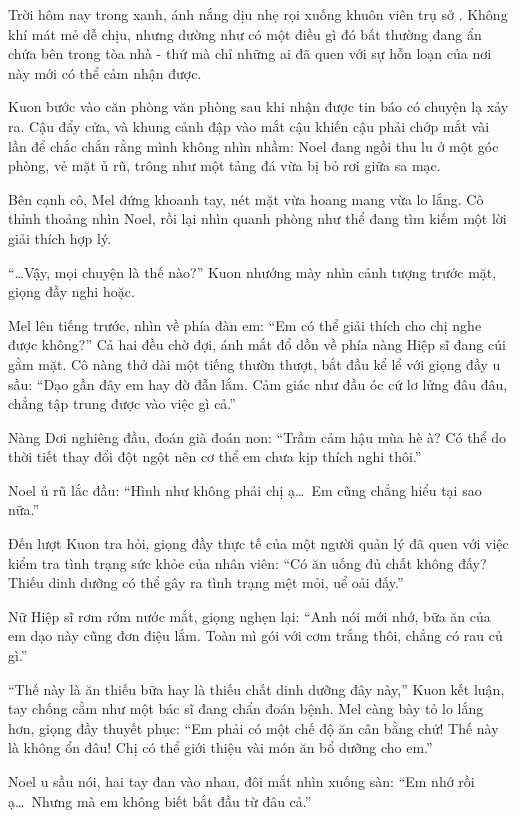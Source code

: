 \documentclass[../main.tex]{subfiles}
\begin{document}
Trời hôm nay trong xanh, ánh nắng dịu nhẹ rọi xuống khuôn viên trụ sở \hll. Không khí mát mẻ dễ chịu, nhưng dường như có một điều gì đó bất thường đang ẩn chứa bên trong tòa nhà - thứ mà chỉ những ai đã quen với sự hỗn loạn của nơi này mới có thể cảm nhận được.

Kuon bước vào căn phòng văn phòng sau khi nhận được tin báo có chuyện lạ xảy ra. Cậu đẩy cửa, và khung cảnh đập vào mắt cậu khiến cậu phải chớp mắt vài lần để chắc chắn rằng mình không nhìn nhầm: Noel đang ngồi thu lu ở một góc phòng, vẻ mặt ủ rũ, trông như một tảng đá vừa bị bỏ rơi giữa sa mạc.

Bên cạnh cô, Mel đứng khoanh tay, nét mặt vừa hoang mang vừa lo lắng. Cô thỉnh thoảng nhìn Noel, rồi lại nhìn quanh phòng như thể đang tìm kiếm một lời giải thích hợp lý.

``\dots Vậy, mọi chuyện là thế nào?'' Kuon nhướng mày nhìn cảnh tượng trước mặt, giọng đầy nghi hoặc.

Mel lên tiếng trước, nhìn về phía đàn em: ``Em có thể giải thích cho chị nghe được không?'' Cả hai đều chờ đợi, ánh mắt đổ dồn về phía nàng Hiệp sĩ đang cúi gằm mặt. Cô nàng thở dài một tiếng thườn thượt, bắt đầu kể lể với giọng đầy u sầu: ``Dạo gần đây em hay đờ đẫn lắm. Cảm giác như đầu óc cứ lơ lửng đâu đâu, chẳng tập trung được vào việc gì cả.''

Nàng Dơi nghiêng đầu, đoán già đoán non: ``Trầm cảm hậu mùa hè à? Có thể do thời tiết thay đổi đột ngột nên cơ thể em chưa kịp thích nghi thôi.''

Noel ủ rũ lắc đầu: ``Hình như không phải chị ạ\dots\ Em cũng chẳng hiểu tại sao nữa.''

Đến lượt Kuon tra hỏi, giọng đầy thực tế của một người quản lý đã quen với việc kiểm tra tình trạng sức khỏe của nhân viên: ``Có ăn uống đủ chất không đấy? Thiếu dinh dưỡng có thể gây ra tình trạng mệt mỏi, uể oải đấy.''

Nữ Hiệp sĩ rơm rớm nước mắt, giọng nghẹn lại: ``Anh nói mới nhớ, bữa ăn của em dạo này cũng đơn điệu lắm. Toàn mì gói với cơm trắng thôi, chẳng có rau củ gì.''

``Thế này là ăn thiếu bữa hay là thiếu chất dinh dưỡng đây này,'' Kuon kết luận, tay chống cằm như một bác sĩ đang chẩn đoán bệnh. Mel càng bày tỏ lo lắng hơn, giọng đầy thuyết phục: ``Em phải có một chế độ ăn cân bằng chứ! Thế này là không ổn đâu! Chị có thể giới thiệu vài món ăn bổ dưỡng cho em.''

Noel u sầu nói, hai tay đan vào nhau, đôi mắt nhìn xuống sàn: ``Em nhớ rồi ạ\dots\ Nhưng mà em không biết bắt đầu từ đâu cả.''
\end{document}

